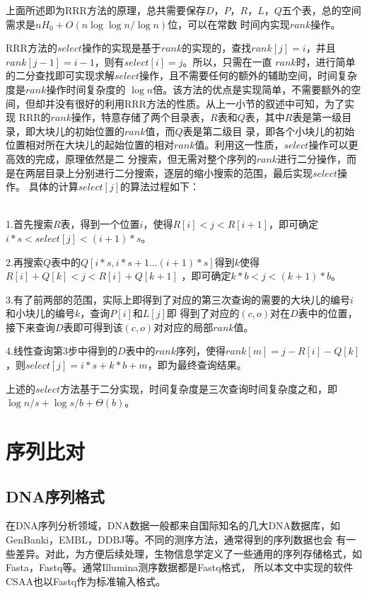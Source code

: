 上面所述即为RRR方法的原理，总共需要保存$D，P，R，L，Q$五个表，总的空间需求是$nH_0 + O(n \log\log n/\log n)$位，可以在常数
时间内实现$rank$操作。

RRR方法的$select$操作的实现是基于$rank$的实现的，查找$rank[j]=i$，并且$rank[j-1]=i-1$，则有$select[i]=j$。所以，只需在一直
$rank$时，进行简单的二分查找即可实现求解$select$操作，且不需要任何的额外的辅助空间，时间复杂度是$rank$操作时间复杂度的
$\log n$倍。该方法的优点是实现简单，不需要额外的空间，但却并没有很好的利用RRR方法的性质。从上一小节的叙述中可知，为了实现
RRR的$rank$操作，特意存储了两个目录表，$R$表和$Q$表，其中$R$表是第一级目录，即大块儿的初始位置的$rank$值，而$Q$表是第二级目
录，即各个小块儿的初始位置相对所在大块儿的起始位置的相对$rank$值。利用这一性质，$select$操作可以更高效的完成，原理依然是二
分搜索，但无需对整个序列的$rank$进行二分操作，而是在两层目录上分别进行二分搜索，逐层的缩小搜索的范围，最后实现$select$操作。
具体的计算$select[j]$的算法过程如下：

\begin{algo}
    \qquad \\

    1.首先搜索$R$表，得到一个位置$i$，使得$R[i]<j<R[i+1]$，即可确定$i*s<select[j]<(i+1)*s$。
    
    2.再搜索$Q$表中的$Q[i*s,i*s+1\ldots (i+1)*s]$得到$k$使得$R[i]+Q[k]<j<R[i]+Q[k+1]$ ，即可确定$k*b<j<(k+1)*b$。
    
    3.有了前两部的范围，实际上即得到了对应的第三次查询的需要的大块儿的编号$i$和小块儿的编号$k$，查询$P[i]$和$L[j]$即
    得到了对应的$(c,o)$对在$D$表中的位置，接下来查询$D$表即可得到该$(c,o)$对对应的局部$rank$值。
    
    4.线性查询第3步中得到的$D$表中的$rank$序列，使得$rank[m]=j-R[i]-Q[k]$，则$select[j]=i*s+k*b+m$，即为最终查询结果。
\end{algo}

上述的$select$方法基于二分实现，时间复杂度是三次查询时间复杂度之和，即$\log{n/s}+\log{s/b}+\Theta(b)$。

\section{序列比对}

\subsection{DNA序列格式}

在DNA序列分析领域，DNA数据一般都来自国际知名的几大DNA数据库，如GenBanki，EMBL，DDBJ等。不同的测序方法，通常得到的序列数据也会
有一些差异。对此，为方便后续处理，生物信息学定义了一些通用的序列存储格式，如Fasta，Fastq等。通常Illumina测序数据都是Fastq格式，
所以本文中实现的软件CSAA也以Fastq作为标准输入格式。

